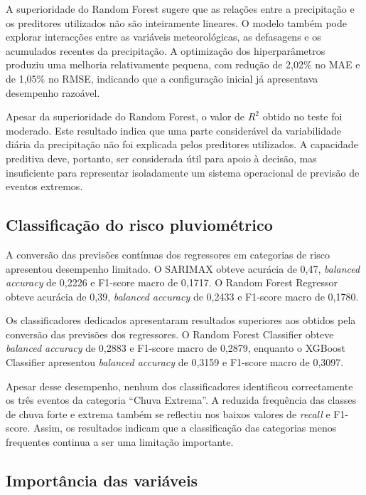 \documentclass[9pt,twocolumn,twoside,english,portuguese]{opticajnl}
\begin{document}
A superioridade do Random Forest sugere que as relações entre a
precipitação e os preditores utilizados não são inteiramente lineares. O
modelo também pode explorar interacções entre as variáveis meteorológicas,
as defasagens e os acumulados recentes da precipitação. A optimização dos
hiperparâmetros produziu uma melhoria relativamente pequena, com redução de
2,02\% no MAE e de 1,05\% no RMSE, indicando que a configuração inicial já
apresentava desempenho razoável.

Apesar da superioridade do Random Forest, o valor de $R^2$ obtido no teste
foi moderado. Este resultado indica que uma parte considerável da
variabilidade diária da precipitação não foi explicada pelos preditores
utilizados. A capacidade preditiva deve, portanto, ser considerada útil
para apoio à decisão, mas insuficiente para representar isoladamente um
sistema operacional de previsão de eventos extremos.

\subsection{Classificação do risco pluviométrico}

A conversão das previsões contínuas dos regressores em categorias de risco
apresentou desempenho limitado. O SARIMAX obteve acurácia de 0,47,
\textit{balanced accuracy} de 0,2226 e F1-score macro de 0,1717. O Random
Forest Regressor obteve acurácia de 0,39, \textit{balanced accuracy} de
0,2433 e F1-score macro de 0,1780.

Os classificadores dedicados apresentaram resultados superiores aos obtidos
pela conversão das previsões dos regressores. O Random Forest Classifier
obteve \textit{balanced accuracy} de 0,2883 e F1-score macro de 0,2879,
enquanto o XGBoost Classifier apresentou \textit{balanced accuracy} de
0,3159 e F1-score macro de 0,3097.

Apesar desse desempenho, nenhum dos classificadores identificou
correctamente os três eventos da categoria ``Chuva Extrema''. A reduzida
frequência das classes de chuva forte e extrema também se reflectiu nos
baixos valores de \textit{recall} e F1-score. Assim, os resultados indicam
que a classificação das categorias menos frequentes continua a ser uma
limitação importante.

\subsection{Importância das variáveis}
\end{document}
